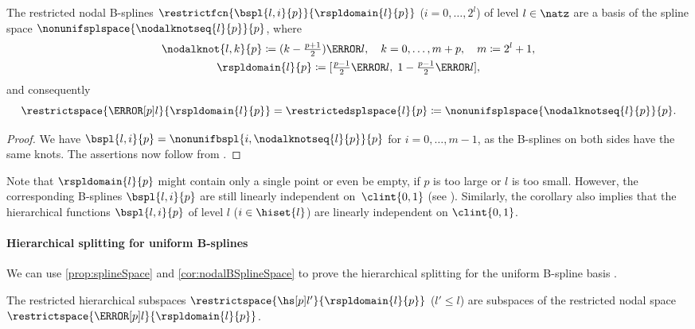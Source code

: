 \begin{corollary}
  \label{cor:nodalBSplineSpace}
  The restricted nodal B-splines $\restrictfcn{\bspl{l,i}{p}}{\rspldomain{l}{p}}$
  ($i = 0, \dotsc, 2^l$)
  of level $l \in \natz$ are
  a basis of the spline space $\nonunifsplspace{\nodalknotseq{l}{p}}{p}$,
  where
  \begin{subequations}
    \begin{gather}
      \nodalknot{l,k}{p}
      \ceq (k - \tfrac{p+1}{2}) \ms{l},\quad
      k = 0, \dotsc, m + p,\quad
      m \ceq 2^l + 1,\\
      \rspldomain{l}{p} \ceq [\tfrac{p-1}{2} \ms{l},\;
      1 - \tfrac{p-1}{2} \ms{l}],
    \end{gather}
  \end{subequations}
  and consequently
  \begin{equation}
    \restrictspace{\nsbspl{l}{p}}{\rspldomain{l}{p}}
    = \restrictedsplspace{l}{p}
    \ceq \nonunifsplspace{\nodalknotseq{l}{p}}{p}.
  \end{equation}
\end{corollary}

\begin{proof}
  We have $\bspl{l,i}{p} = \nonunifbspl{i,\nodalknotseq{l}{p}}{p}$ for
  $i = 0, \dotsc, m - 1$,
  as the B-splines on both sides have the same knots.
  The assertions now follow from .
\end{proof}

\vspace{1em}

Note that $\rspldomain{l}{p}$ might contain only a single point or even be empty,
if $p$ is too large or $l$ is too small.
However, the corresponding B-splines $\bspl{l,i}{p}$ are still linearly
independent on~$\clint{0, 1}$ (see \cite{Hoellig13Approximation}).
Similarly, the corollary also implies that the hierarchical functions
$\bspl{l,i}{p}$ of level $l$ ($i \in \hiset{l}$)
are linearly independent on $\clint{0, 1}$.

\paragraph{Hierarchical splitting for uniform B-splines}

We can use \cref{prop:splineSpace} and \cref{cor:nodalBSplineSpace}
to prove the hierarchical splitting for the uniform B-spline basis
\cite{Valentin16Hierarchical}.

\begin{lemma}
  \label{lemma:hierBSplineInNodalSpace}
  The restricted hierarchical subspaces
  $\restrictspace{\hsbspl{l'}{p}}{\rspldomain{l}{p}}$ ($l' \le l$) are
  subspaces of the restricted nodal space $\restrictspace{\nsbspl{l}{p}}{\rspldomain{l}{p}}$.
\end{lemma}

